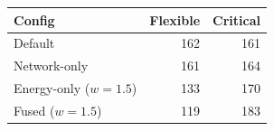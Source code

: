 \begin{tabular}{@{}lrr@{}}
\toprule
Config & Flexible & Critical \\
\midrule
Default & 162 & 161 \\
Network-only & 161 & 164 \\
Energy-only ($w{=}1.5$) & 133 & 170 \\
Fused ($w{=}1.5$) & 119 & 183 \\
\bottomrule
\end{tabular}
